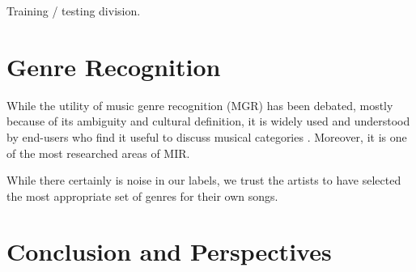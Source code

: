 \documentclass{article}
\begin{document}
Training / testing division.


\section{Genre Recognition} %


While the utility of music genre recognition (MGR) has been debated, mostly because of its ambiguity and cultural definition, it is widely used and understood by end-users who find it useful to discuss musical categories \cite{mgr_why}. Moreover, it is one of the most researched areas of MIR.

While there certainly is noise in our labels, we trust the artists to have selected the most appropriate set of genres for their own songs.

%
%


\section{Conclusion and Perspectives}
\end{document}
